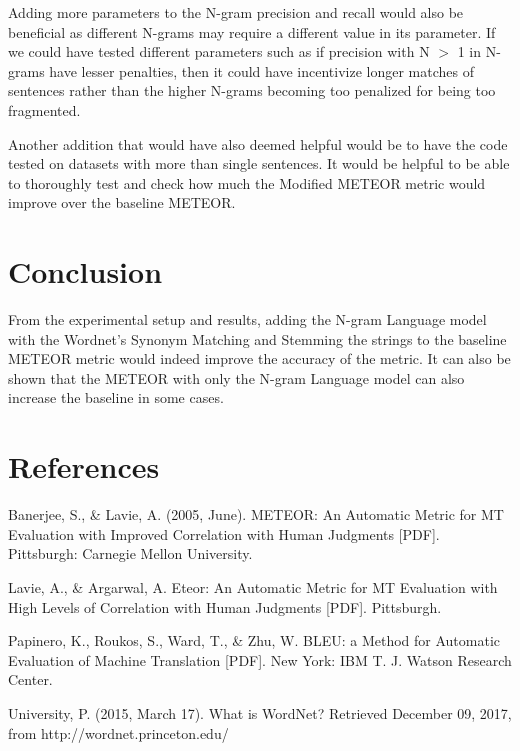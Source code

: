 \documentclass[11pt,letterpaper]{article}
\begin{document}
Adding more parameters to the N-gram precision and recall would also be beneficial as different N-grams may require a different value in its parameter. If we could have tested different parameters such as if precision with N \(>\) 1 in N-grams have lesser penalties, then it could have incentivize longer matches of sentences rather than the higher N-grams becoming too penalized for being too fragmented. 

Another addition that would have also deemed helpful would be to have the code tested on datasets with more than single sentences. It would be helpful to be able to thoroughly test and check how much the Modified METEOR metric would improve over the baseline METEOR.


\section{Conclusion}

From the experimental setup and results, adding the N-gram Language model with the Wordnet's Synonym Matching and Stemming the strings to the baseline METEOR metric would indeed improve the accuracy of the metric. It can also be shown that the METEOR with only the N-gram Language model can also increase the baseline in some cases. 

\section{References}




Banerjee, S., \& Lavie, A. (2005, June). METEOR: An Automatic Metric for MT Evaluation with Improved Correlation with Human Judgments [PDF]. Pittsburgh: Carnegie Mellon University.

Lavie, A., \& Argarwal, A. Eteor: An Automatic Metric for MT Evaluation with High Levels of Correlation with Human Judgments [PDF]. Pittsburgh.

Papinero, K., Roukos, S., Ward, T., \& Zhu, W. BLEU: a Method for Automatic Evaluation of Machine Translation [PDF]. New York: IBM T. J. Watson Research Center.

University, P. (2015, March 17). What is WordNet? Retrieved December 09, 2017, from http://wordnet.princeton.edu/
\end{document}
